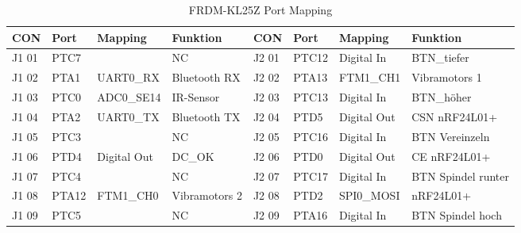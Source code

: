 \begin{table}[H]
	\scriptsize
	\centering
	\caption{FRDM-KL25Z Port Mapping}
	\begin{tabular}{|r|r|r|r|l|l|r|l|}
		\hline
		\multicolumn{1}{|l|}{\textbf{CON}} & \multicolumn{1}{l|}{\textbf{Port}} & \multicolumn{1}{l|}{\textbf{Mapping}} & \multicolumn{1}{l|}{\textbf{Funktion}} & \textbf{CON} & \textbf{Port} & \multicolumn{1}{l|}{\textbf{Mapping}} & \textbf{Funktion} \\
		\hline
		\multicolumn{1}{|l|}{J1 01} & \multicolumn{1}{l|}{PTC7} &       & \multicolumn{1}{l|}{NC} & J2 01 & PTC12 & \multicolumn{1}{l|}{Digital In} & BTN\_tiefer \\
		\hline
		\multicolumn{1}{|l|}{J1 02} & \multicolumn{1}{l|}{PTA1 } & \multicolumn{1}{l|}{UART0\_RX} & \multicolumn{1}{l|}{Bluetooth RX} & J2 02 & PTA13  & \multicolumn{1}{l|}{FTM1\_CH1} & Vibramotors 1 \\
		\hline
		\multicolumn{1}{|l|}{J1 03} & \multicolumn{1}{l|}{PTC0} & \multicolumn{1}{l|}{ADC0\_SE14} & \multicolumn{1}{l|}{IR-Sensor} & J2 03 & PTC13 & \multicolumn{1}{l|}{Digital In} & BTN\_höher \\
		\hline
		\multicolumn{1}{|l|}{J1 04} & \multicolumn{1}{l|}{PTA2 } & \multicolumn{1}{l|}{UART0\_TX} & \multicolumn{1}{l|}{Bluetooth TX} & J2 04 & PTD5  & \multicolumn{1}{l|}{Digital Out} & CSN nRF24L01+ \\
		\hline
		\multicolumn{1}{|l|}{J1 05} & \multicolumn{1}{l|}{PTC3} &       & \multicolumn{1}{l|}{NC} & J2 05 & PTC16 & \multicolumn{1}{l|}{Digital In} & BTN Vereinzeln \\
		\hline
		\multicolumn{1}{|l|}{J1 06} & \multicolumn{1}{l|}{PTD4 } & \multicolumn{1}{l|}{Digital Out} & \multicolumn{1}{l|}{DC\_OK} & J2 06 & PTD0  & \multicolumn{1}{l|}{Digital Out} & CE nRF24L01+ \\
		\hline
		\multicolumn{1}{|l|}{J1 07} & \multicolumn{1}{l|}{PTC4} &       & \multicolumn{1}{l|}{NC} & J2 07 & PTC17 & \multicolumn{1}{l|}{Digital In} & BTN Spindel runter \\
		\hline
		\multicolumn{1}{|l|}{J1 08} & \multicolumn{1}{l|}{PTA12 } & \multicolumn{1}{l|}{FTM1\_CH0} & \multicolumn{1}{l|}{Vibramotors 2} & J2 08 & PTD2  & \multicolumn{1}{l|}{SPI0\_MOSI} & nRF24L01+ \\
		\hline
		\multicolumn{1}{|l|}{J1 09} & \multicolumn{1}{l|}{PTC5} &       & \multicolumn{1}{l|}{NC} & J2 09 & PTA16  & \multicolumn{1}{l|}{Digital In} & BTN Spindel hoch \\

\end{tabular}
\end{table}
